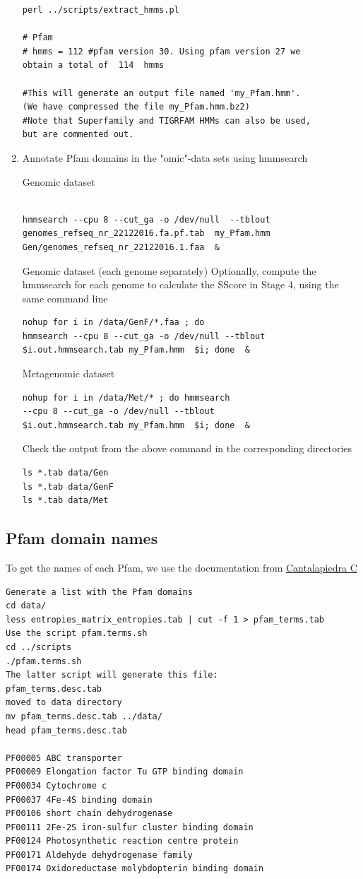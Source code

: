 \documentclass[12pt]{report}
\begin{document}
\begin{enumerate}
\begin{verbatim}
perl ../scripts/extract_hmms.pl 

# Pfam
# hmms = 112 #pfam version 30. Using pfam version 27 we 
obtain a total of  114  hmms  

#This will generate an output file named 'my_Pfam.hmm'. 
(We have compressed the file my_Pfam.hmm.bz2) 
#Note that Superfamily and TIGRFAM HMMs can also be used, 
but are commented out.

\end{verbatim}

\item Annotate Pfam domains in the "omic"-data sets using hmmsearch 

Genomic dataset 
\begin{verbatim}

hmmsearch --cpu 8 --cut_ga -o /dev/null  --tblout 
genomes_refseq_nr_22122016.fa.pf.tab  my_Pfam.hmm 
Gen/genomes_refseq_nr_22122016.1.faa  & 
\end{verbatim}

Genomic dataset (each genome separately) 
Optionally, compute the hmmsearch for each genome to calculate the SScore in Stage 4, using the same command line  
\begin{verbatim}
nohup for i in /data/GenF/*.faa ; do 
hmmsearch --cpu 8 --cut_ga -o /dev/null --tblout 
$i.out.hmmsearch.tab my_Pfam.hmm  $i; done  & 
\end{verbatim}

Metagenomic dataset  
\begin{verbatim}
nohup for i in /data/Met/* ; do hmmsearch 
--cpu 8 --cut_ga -o /dev/null --tblout 
$i.out.hmmsearch.tab my_Pfam.hmm  $i; done  &
\end{verbatim}

Check the output from the above command in the corresponding directories 

\begin{verbatim}
ls *.tab data/Gen 
ls *.tab data/GenF 
ls *.tab data/Met
\end{verbatim}
\end{enumerate}
\subsection{Pfam domain names}
To get the names of each Pfam, we use the documentation from \href{https://github.com/Cantalapiedra/pfam_terms}{Cantalapiedra C} 

\begin{verbatim}
Generate a list with the Pfam domains 
cd data/
less entropies_matrix_entropies.tab | cut -f 1 > pfam_terms.tab
Use the script pfam.terms.sh 
cd ../scripts
./pfam.terms.sh 
The latter script will generate this file:
pfam_terms.desc.tab
moved to data directory 
mv pfam_terms.desc.tab ../data/
head pfam_terms.desc.tab 

PF00005	ABC transporter
PF00009	Elongation factor Tu GTP binding domain
PF00034	Cytochrome c
PF00037	4Fe-4S binding domain
PF00106	short chain dehydrogenase
PF00111	2Fe-2S iron-sulfur cluster binding domain
PF00124	Photosynthetic reaction centre protein
PF00171	Aldehyde dehydrogenase family
PF00174	Oxidoreductase molybdopterin binding domain
\end{verbatim}
\end{document}
